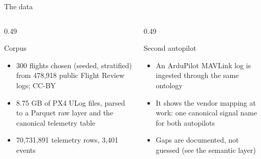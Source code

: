 \documentclass[aspectratio=169,10pt]{beamer}
\begin{document}
\begin{frame}[shrink=5]{The data}
\begin{columns}[T]
\begin{column}{0.49\textwidth}
\begin{block}{Corpus}
\begin{itemize}
  \item 300 flights chosen (seeded, stratified) from 478,918 public Flight Review logs; CC-BY
  \item 8.75 GB of PX4 ULog files, parsed to a Parquet raw layer and the canonical telemetry table
  \item 70,731,891 telemetry rows, 3,401 events
\end{itemize}
\end{block}
\end{column}
\begin{column}{0.49\textwidth}
\begin{block}{Second autopilot}
\begin{itemize}
  \item An ArduPilot MAVLink log is ingested through the same ontology
  \item It shows the vendor mapping at work: one canonical signal name for both autopilots
  \item Gaps are documented, not guessed (see the semantic layer)
\end{itemize}
\end{block}
\end{column}
\end{columns}
\end{frame}
\end{document}
